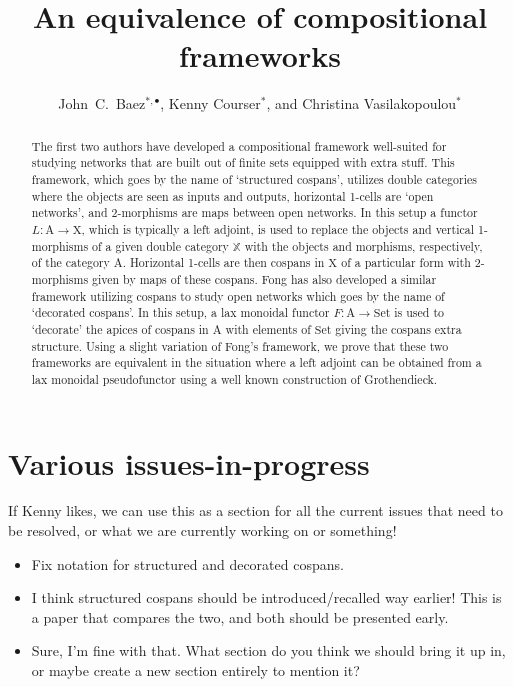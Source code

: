 \documentclass{amsart}
\title{An equivalence of compositional frameworks}
\author{John\ C.\ Baez$^{*,\bullet}$, Kenny Courser$^*$, and Christina Vasilakopoulou$^*$}
\begin{document}
\begin{abstract}
\noindent
The first two authors have developed a compositional framework well-suited for studying networks that are built out of finite sets equipped with extra stuff. This framework, which goes by the name of `structured cospans', utilizes double categories where the objects are seen as inputs and outputs, horizontal 1-cells are `open networks', and 2-morphisms are maps between open networks. In this setup a functor $L \colon \textrm{A} \to \textrm{X}$, which is typically a left adjoint, is used to replace the objects and vertical 1-morphisms of a given double category $\mathbb{X}$ with the objects and morphisms, respectively, of the category $\textrm{A}$. Horizontal 1-cells are then cospans in $\textrm{X}$ of a particular form with 2-morphisms given by maps of these cospans. Fong has also developed a similar framework utilizing cospans to study open networks which goes by the name of `decorated cospans'. In this setup, a lax monoidal functor $F \colon \textrm{A} \to \textrm{Set}$ is used to `decorate' the apices of cospans in $\textrm{A}$ with elements of $\textrm{Set}$ giving the cospans extra structure. Using a slight variation of Fong's framework, we prove that these two frameworks are equivalent in the situation where a left adjoint can be obtained from a lax monoidal pseudofunctor using a well known construction of Grothendieck.
\end{abstract}

\maketitle

\tableofcontents

\section*{Various issues-in-progress}
{\chris If Kenny likes, we can use this as a section for all the current issues that need to be resolved, or what we are currently working on or something!}
\begin{itemize}
\item Fix notation for structured and decorated cospans.
\item {\chris I think structured cospans should be introduced/recalled way earlier! This is a paper that compares the two,
and both should be presented early.}
\item Sure, I'm fine with that. What section do you think we should bring it up in, or maybe create a new section entirely to mention it?
\end{itemize}
\end{document}

